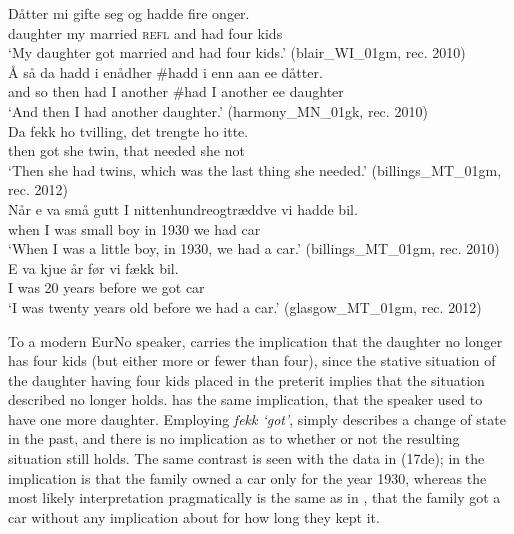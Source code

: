 \documentclass[output=paper]{langscibook}
\begin{document}
\ea%
    \label{ex:eide:17}
    \ea \label{ex:eide:17a} 
    \gll         Dåtter mi gifte seg og hadde fire onger.         \\
                 daughter my married \textsc{refl} and had four kids    \\
    \glt        ‘My daughter got married and had four kids.’ (blair\_WI\_01gm, rec. 2010)\\
    \ex \label{ex:eide:17b} 
    \gll        Å så da hadd i enådher \#hadd i {enn aan} ee dåtter.\\
                and so then had I another \#had I another  ee daughter\\
    \glt        ‘And then I had another daughter.’ ({{harmony\_MN\_01gk}}, rec. 2010)\\
    \ex  \label{ex:eide:17c} 
    \gll        Da fekk ho tvilling, det trengte ho itte.        \\
                then got she twin, that needed she not        \\
    \glt        ‘Then she had twins, which was the last thing she needed.’ (billings\_MT\_01gm, rec. 2012)\\
    \ex \label{ex:eide:17d} 
    \gll       Når e va små gutt I nittenhundreogtræddve vi hadde bil.    \\
         	  when I was small boy in 1930 we had car      \\
    \glt       ‘When I was a little boy, in 1930, we had a car.’ (billings\_MT\_01gm, rec. 2010)\\
    \ex \label{ex:eide:17e} 
    \gll E va kjue år før vi fækk bil.           \\
         I was 20 years before we got car        \\
    \glt ‘I was twenty years old before we had a car.’ (glasgow\_MT\_01gm, rec. 2012)\\
    \z %
\z

To a modern EurNo speaker,  carries the implication that the daughter no longer has four kids (but either more or fewer than four), since the stative situation of the daughter having four kids placed in the preterit implies that the situation described no longer holds.  has the same implication, that the speaker used to have one more daughter. Employing \textit{fekk ‘got’},  simply describes a change of state in the past, and there is no implication as to whether or not the resulting situation still holds. The same contrast is seen with the data in (17de); in  the implication is that the family owned a car only for the year 1930, whereas the most likely interpretation pragmatically is the same as in , that the family got a car without any implication about for how long they kept it. 
\end{document}

